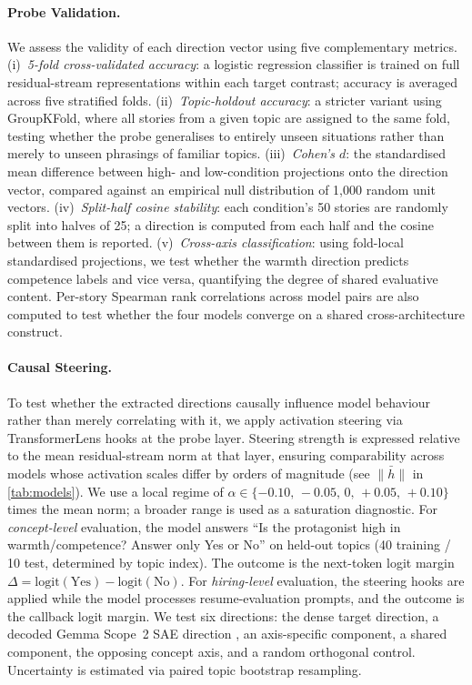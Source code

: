 \documentclass[twocolumn]{article}
\begin{document}
\paragraph{Probe Validation.}
We assess the validity of each direction vector using five complementary
metrics.
(i)~\textit{5-fold cross-validated accuracy}: a logistic regression classifier
is trained on full residual-stream representations within each target contrast;
accuracy is averaged across five stratified folds.
(ii)~\textit{Topic-holdout accuracy}: a stricter variant using GroupKFold,
where all stories from a given topic are assigned to the same fold, testing
whether the probe generalises to entirely unseen situations rather than merely
to unseen phrasings of familiar topics.
(iii)~\textit{Cohen's $d$}: the standardised mean difference between
high- and low-condition projections onto the direction vector, compared against
an empirical null distribution of 1,000 random unit vectors.
(iv)~\textit{Split-half cosine stability}: each condition's 50 stories are
randomly split into halves of 25; a direction is computed from each half and
the cosine between them is reported.
(v)~\textit{Cross-axis classification}: using fold-local standardised
projections, we test whether the warmth direction predicts competence labels
and vice versa, quantifying the degree of shared evaluative content.
Per-story Spearman rank correlations across model pairs are also computed to
test whether the four models converge on a shared cross-architecture construct.

\paragraph{Causal Steering.}
To test whether the extracted directions causally influence model behaviour
rather than merely correlating with it, we apply activation steering
\citep{turner2023activation} via TransformerLens hooks at the probe layer.
Steering strength is expressed relative to the mean residual-stream norm at
that layer, ensuring comparability across models whose activation scales
differ by orders of magnitude (see $\bar{\|h\|}$ in \autoref{tab:models}).
We use a local regime of $\alpha \in \{-0.10,\,-0.05,\,0,\,+0.05,\,+0.10\}$
times the mean norm; a broader range is used as a saturation diagnostic.
For \textit{concept-level} evaluation, the model answers ``Is the protagonist
high in warmth/competence? Answer only Yes or No'' on held-out topics (40
training / 10 test, determined by topic index).
The outcome is the next-token logit margin $\Delta = \mathrm{logit}(\text{Yes}) -
\mathrm{logit}(\text{No})$.
For \textit{hiring-level} evaluation, the steering hooks are applied while
the model processes resume-evaluation prompts, and the outcome is the
callback logit margin.
We test six directions: the dense target direction, a decoded
Gemma Scope~2 SAE direction \citep{deepmind2025gemmascope2}, an axis-specific
component, a shared component, the opposing concept axis, and a random
orthogonal control.
Uncertainty is estimated via paired topic bootstrap resampling.
\end{document}
